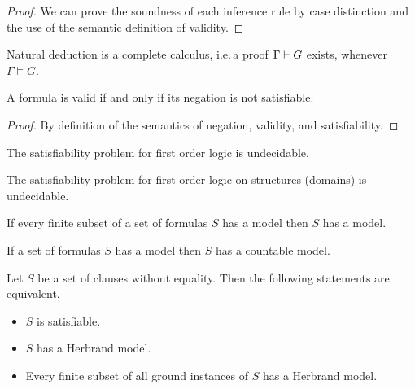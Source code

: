 \begin{proof}
	We can prove the soundness of each inference rule by case distinction and the use of the semantic definition of validity.
\end{proof}



\begin{theorem}
	Natural deduction is a complete calculus,
	i.e.\,a proof \( \Gamma\vdash G \) exists,
	whenever \( \Gamma\models G \).
\end{theorem}




\begin{lemma}[Refutation]
	A formula is valid if and only if its negation is not satisfiable.
\end{lemma}
\begin{proof}
By definition of the semantics of negation, validity, and satisfiability.
\end{proof}

\begin{theorem}
	The satisfiability problem for first order logic is undecidable.
\end{theorem}

\begin{theorem}
	The satisfiability problem for first order logic on  structures (domains) is undecidable.
\end{theorem}

\begin{theorem}\label{the:compactness}
	If every finite subset of a set of formulas \( S \) has a model then \( S \) has a model.
\end{theorem}

\begin{theorem}\label{the:loewenheim}
	If a set of formulas \( S \) has a model then \( S \) has a countable model.
\end{theorem}

\begin{theorem}[Herbrand, 1930]\label{the:herbrand}
	Let \( S \) be a set of clauses without equality. Then the following statements are equivalent.
	\begin{itemize}
		\item \( S \) is satisfiable.
		\item \( S \) has a Herbrand model.
		\item Every finite subset of all ground instances of \( S \) has a Herbrand model.
	\end{itemize}
\end{theorem}

